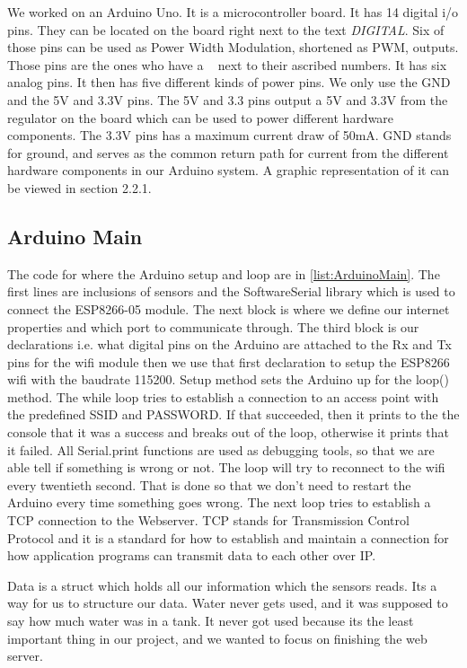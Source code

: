 \documentclass[a4paper,12pt,oneside,openright,titlepage]{book}
\begin{document}
We worked on an Arduino Uno. It is a microcontroller board. It has 14 digital i/o pins. They can be located on the board right next to the text \textit{DIGITAL}. Six of those pins can be used as Power Width Modulation, shortened as PWM, outputs. Those pins are the ones who have a ~ next to their ascribed numbers. It has six analog pins. It then has five different kinds of power pins. We only use the GND and the 5V and 3.3V pins. The 5V and 3.3 pins output a 5V and 3.3V from the regulator on the board which can be used to power different hardware components. The 3.3V pins has a maximum current draw of 50mA. GND stands for ground, and serves as the common return path for current from the different hardware components in our Arduino system. A graphic representation of it can be viewed in section 2.2.1. 

\subsection{Arduino Main}
The code for where the Arduino setup and loop are in \ref{list:ArduinoMain}. The first lines are inclusions of sensors and the SoftwareSerial library which is used to connect the ESP8266-05 module. The next block is where we define our internet properties and which port to communicate through. The third block is our declarations i.e. what digital pins on the Arduino are attached to the Rx and Tx pins for the wifi module then we use that first declaration to setup the ESP8266 wifi with the baudrate 115200. Setup method sets the Arduino up for the loop() method. The while loop tries to establish a connection to an access point with the predefined SSID and PASSWORD. If that succeeded, then it prints to the the console that it was a success and breaks out of the loop, otherwise it prints that it failed. All Serial.print functions are used as debugging tools, so that we are able tell if something is wrong or not. The loop will try to reconnect to the wifi every twentieth second. That is done so that we don't need to restart the Arduino every time something goes wrong. The next loop tries to establish a TCP connection to the Webserver. TCP stands for Transmission Control Protocol and it is a standard for how to establish and maintain a connection for how application programs can transmit data to each other over IP. 

Data is a struct which holds all our information which the sensors reads. Its a way for us to structure our data. Water never gets used, and it was supposed to say how much water was in a tank. It never got used because its the least important thing in our project, and we wanted to focus on finishing the web server.
\end{document}
